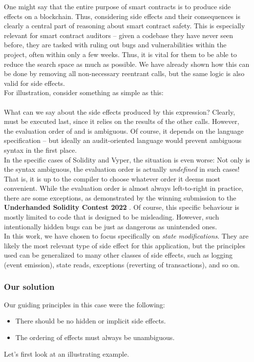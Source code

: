 One might say that the entire purpose of smart contracts is to produce side effects on a blockchain. Thus, considering side effects and their consequences is clearly a central part of reasoning about smart contract safety. This is especially relevant for smart contract auditors -- given a codebase they have never seen before, they are tasked with ruling out bugs and vulnerabilities within the project, often within only a few weeks. Thus, it is vital for them to be able to reduce the search space as much as possible. We have already shown how this can be done by removing all non-necessary reentrant calls, but the same logic is also valid for side effects. \\
For illustration, consider something as simple as this: \\
\\
What can we say about the side effects produced by this expression? Clearly,  must be executed last, since it relies on the results of the other calls. However, the evaluation order of  and  is ambiguous. Of course, it depends on the language specification -- but ideally an audit-oriented language would prevent ambiguous syntax in the first place. \\
In the specific cases of Solidity and Vyper, the situation is even worse: Not only is the syntax ambiguous, the evaluation order is actually \textit{undefined} in such cases! That is, it is up to the compiler to choose whatever order it deems most convenient. While the evaluation order is almost always left-to-right in practice, there are some exceptions, as demonstrated by the winning submission to the \textbf{Underhanded Solidity Contest 2022} \cite{underhanded}. Of course, this specific behaviour is mostly limited to code that is designed to be misleading. However, such intentionally hidden bugs can be just as dangerous as unintended ones. \\
In this work, we have chosen to focus specifically on \textit{state modifications}. They are likely the most relevant type of side effect for this application, but the principles used can be generalized to many other classes of side effects, such as logging (event emission), state reads, exceptions (reverting of transactions), and so on. 

\subsubsection{Our solution}
Our guiding principles in this case were the following:
\begin{itemize}
	\item There should be no hidden or implicit side effects.
	\item The ordering of effects must always be unambiguous.
\end{itemize}
Let's first look at an illustrating example.

